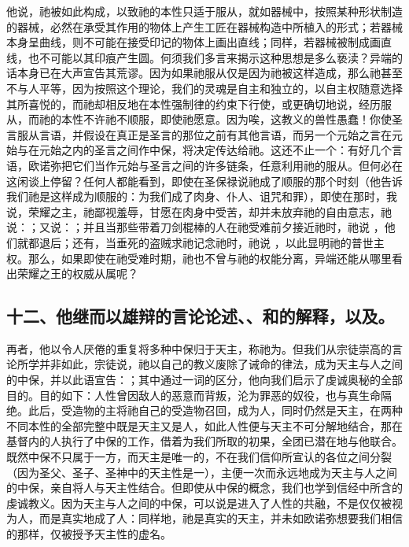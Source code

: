 他说，祂被如此构成，以致祂的本性只适于服从，就如器械中，按照某种形状制造的器械，必然在承受其作用的物体上产生工匠在器械构造中所植入的形式；若器械本身呈曲线，则不可能在接受印记的物体上画出直线；同样，若器械被制成画直线，也不可能以其印痕产生圆。何须我们多言来揭示这种思想是多么亵渎？异端的话本身已在大声宣告其荒谬。因为如果祂服从仅是因为祂被这样造成，那么祂甚至不与人平等，因为按照这个理论，我们的灵魂是自主和独立的，以自主权随意选择其所喜悦的，而祂却相反地在本性强制律的约束下行使，或更确切地说，经历服从，而祂的本性不许祂不顺服，即使祂愿意。因为唉，这教义的兽性愚蠢！你使圣言服从言语，并假设在真正是圣言的那位之前有其他言语，而另一个元始之言在元始与在元始之内的圣言之间作中保，将决定传达给祂。这还不止一个：有好几个言语，欧诺弥把它们当作元始与圣言之间的许多链条，任意利用祂的服从。但何必在这闲谈上停留？任何人都能看到，即使在圣保禄说祂成了顺服的那个时刻（他告诉我们祂是这样成为顺服的：为我们成了肉身、仆人、诅咒和罪），即使在那时，我说，荣耀之主，祂鄙视羞辱，甘愿在肉身中受苦，却并未放弃祂的自由意志，祂说：；又说：；并且当那些带着刀剑棍棒的人在祂受难前夕接近祂时，祂说 ，他们就都退后；还有，当垂死的盗贼求祂记念祂时，祂说 ，以此显明祂的普世主权。那么，如果即使在祂受难时期，祂也不曾与祂的权能分离，异端还能从哪里看出荣耀之王的权威从属呢？\par


\subsection{十二、他继而以雄辩的言论论述、、和的解释，以及。}

再者，他以令人厌倦的重复将多种中保归于天主，称祂为。但我们从宗徒崇高的言论所学并非如此，宗徒说，祂以自己的教义废除了诫命的律法，成为天主与人之间的中保，并以此语宣告：；其中通过一词的区分，他向我们启示了虔诚奥秘的全部目的。目的如下：人性曾因敌人的恶意而背叛，沦为罪恶的奴役，也与真生命隔绝。此后，受造物的主将祂自己的受造物召回，成为人，同时仍然是天主，在两种不同本性的全部完整中既是天主又是人，如此人性便与天主不可分解地结合，那在基督内的人执行了中保的工作，借着为我们所取的初果，全团已潜在地与他联合。既然中保不只属于一方，而天主是唯一的，不在我们信仰所宣认的各位之间分裂（因为圣父、圣子、圣神中的天主性是一），主便一次而永远地成为天主与人之间的中保，亲自将人与天主性结合。但即使从中保的概念，我们也学到信经中所含的虔诚教义。因为天主与人之间的中保，可以说是进入了人性的共融，不是仅仅被视为人，而是真实地成了人：同样地，祂是真实的天主，并未如欧诺弥想要我们相信的那样，仅被授予天主性的虚名。\par

